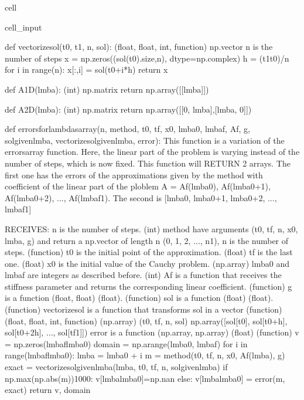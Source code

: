 \documentclass[letterpaper,10pt,english]{jupyterBook}
\begin{document}
\begin{sphinxuseclass}{cell}
\begin{sphinxVerbatimInput}
\begin{sphinxuseclass}{cell_input}
\begin{sphinxVerbatim}[commandchars=\\\{\}]
def vectorize\PYGZus{}sol(t0, t1, n, sol):
    \PYGZsq{}\PYGZsq{}\PYGZsq{}
    (float, float, int, function) \PYGZhy{}\PYGZgt{} np.vector
    n is the number of steps
    \PYGZsq{}\PYGZsq{}\PYGZsq{}
    x = np.zeros((sol(t0).size,n), dtype=np.complex\PYGZus{})
    h = (t1\PYGZhy{}t0)/n
    for i in range(n):
        x[:,i] = sol(t0+i*h)
    return x

def A\PYGZus{}1D(lmba):
  \PYGZsq{}\PYGZsq{}\PYGZsq{}(int) \PYGZhy{}\PYGZgt{} np.matrix\PYGZsq{}\PYGZsq{}\PYGZsq{}
  return np.array([[lmba]])

def A\PYGZus{}2D(lmba):
  \PYGZsq{}\PYGZsq{}\PYGZsq{}(int) \PYGZhy{}\PYGZgt{} np.matrix\PYGZsq{}\PYGZsq{}\PYGZsq{}
  return np.array([[0, \PYGZhy{}lmba],[lmba, 0]])

def errors\PYGZus{}for\PYGZus{}lambdas\PYGZus{}array(n, method, t0, tf, x0, lmba0, lmbaf, Af, g, sol\PYGZus{}given\PYGZus{}lmba, vectorize\PYGZus{}sol\PYGZus{}given\PYGZus{}lmba, error):
    \PYGZsq{}\PYGZsq{}\PYGZsq{}
    This function is a variation of the errors\PYGZus{}array function. Here, the linear
    part of the problem is varying instead of the number of steps, which is now
    fixed.
    This function will RETURN 2 arrays.
    The first one has the errors of the approximations given by the method with
    coefficient of the linear part of the ploblem
    A = Af(lmba0), Af(lmba0+1), Af(lmba0+2), ..., Af(lmbaf\PYGZhy{}1).
    The second is [lmba0, lmba0+1, lmba0+2, ..., lmbaf\PYGZhy{}1]

    RECEIVES:
    n is the number of steps. (int)
    method have arguments (t0, tf, n, x0, lmba, g) and return a
    np.vector of length n (0, 1, 2, ..., n\PYGZhy{}1), n is the number of steps. (function)
    t0 is the initial point of the approximation. (float)
    tf is the last one. (float)
    x0 is the initial value of the Cauchy problem. (np.array)
    lmba0 and lmbaf are integers as described before. (int)
    Af is a function that receives the stiffness parameter and returns the
    corresponding linear coefficient. (function)
    g is a function (float, float) \PYGZhy{}\PYGZgt{} (float). (function)
    sol is a function (float) \PYGZhy{}\PYGZgt{} (float). (function)
    vectorize\PYGZus{}sol is a function that \PYGZdq{}transforms sol in a vector\PYGZdq{} (function)
    (float, float, int, function) \PYGZhy{}\PYGZgt{} (np.array)
    (t0, tf, n, sol) \PYGZhy{}\PYGZgt{} np.array([sol[t0], sol[t0+h], sol[t0+2h], ..., sol[tf\PYGZhy{}1]])
    error is a function (np.array, np.array) \PYGZhy{}\PYGZgt{} (float) (function)
    \PYGZsq{}\PYGZsq{}\PYGZsq{}
    v = np.zeros(lmbaf\PYGZhy{}lmba0)
    domain = np.arange(lmba0, lmbaf)
    for i in range(lmbaf\PYGZhy{}lmba0):
        lmba = lmba0 + i
        m = method(t0, tf, n, x0, Af(lmba), g)
        exact = vectorize\PYGZus{}sol\PYGZus{}given\PYGZus{}lmba(lmba, t0, tf, n, sol\PYGZus{}given\PYGZus{}lmba)
        if np.max(np.abs(m))\PYGZgt{}1000:
            v[lmba\PYGZhy{}lmba0]=np.nan
        else:
            v[lmba\PYGZhy{}lmba0] = error(m, exact)
    return v, domain


\end{sphinxVerbatim}
\end{sphinxuseclass}
\end{sphinxVerbatimInput}
\end{sphinxuseclass}
\end{document}
